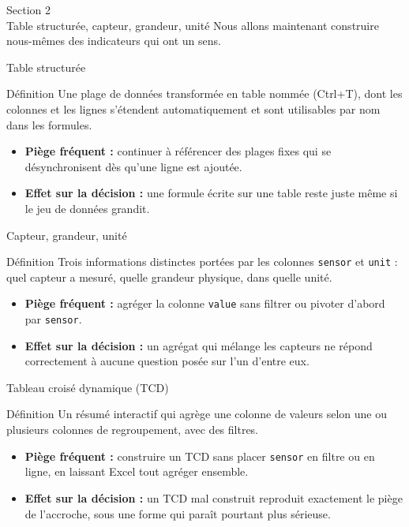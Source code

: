 \documentclass[aspectratio=169]{beamer}
\begin{document}
\begin{frame}[plain]
  \centering
  \Huge Section 2\\[3mm]
  \Large Table structurée, capteur, grandeur, unité
  \vfill
  \normalsize Nous allons maintenant construire nous-mêmes des indicateurs qui ont un sens.
\end{frame}

\begin{frame}{Table structurée}
  \begin{block}{Définition}
    Une plage de données transformée en table nommée (Ctrl+T), dont les colonnes et les lignes s'étendent automatiquement et sont utilisables par nom dans les formules.
  \end{block}
  \begin{itemize}
    \item \textbf{Piège fréquent :} continuer à référencer des plages fixes qui se désynchronisent dès qu'une ligne est ajoutée.
    \item \textbf{Effet sur la décision :} une formule écrite sur une table reste juste même si le jeu de données grandit.
  \end{itemize}
\end{frame}

\begin{frame}{Capteur, grandeur, unité}
  \begin{block}{Définition}
    Trois informations distinctes portées par les colonnes \texttt{sensor} et \texttt{unit} : quel capteur a mesuré, quelle grandeur physique, dans quelle unité.
  \end{block}
  \begin{itemize}
    \item \textbf{Piège fréquent :} agréger la colonne \texttt{value} sans filtrer ou pivoter d'abord par \texttt{sensor}.
    \item \textbf{Effet sur la décision :} un agrégat qui mélange les capteurs ne répond correctement à aucune question posée sur l'un d'entre eux.
  \end{itemize}
\end{frame}

\begin{frame}{Tableau croisé dynamique (TCD)}
  \begin{block}{Définition}
    Un résumé interactif qui agrège une colonne de valeurs selon une ou plusieurs colonnes de regroupement, avec des filtres.
  \end{block}
  \begin{itemize}
    \item \textbf{Piège fréquent :} construire un TCD sans placer \texttt{sensor} en filtre ou en ligne, en laissant Excel tout agréger ensemble.
    \item \textbf{Effet sur la décision :} un TCD mal construit reproduit exactement le piège de l'accroche, sous une forme qui paraît pourtant plus sérieuse.
  \end{itemize}
\end{frame}
\end{document}

